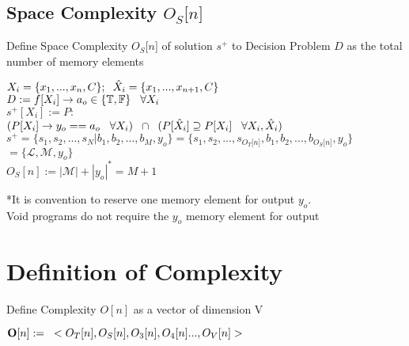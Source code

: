 \documentclass[11pt]{article}
\begin{document}
\subsection{Space Complexity $O_S \lbrack n \rbrack$}
Define Space Complexity $O_S \lbrack n \rbrack$ of solution $s^+$ to Decision Problem $D$ as the total number of memory elements
\begin{center}
\vspace{1mm}
$
X_i = \{x_1,...,x_n,C\}; \hspace{2mm} \hat{X}_i = \{x_1,...,x_{n+1},C\}
$
\\ \vspace{4mm}
$
D := f \lbrack X_i \rbrack \rightarrow a_{o} \in \{\mathbb{T}, \mathbb{F}\} \hspace{3mm} \forall X_i
$
\\ \vspace{4mm}
$
s^+[X_i] := P :
$
\\ \vspace{2mm}
$
(P \lbrack X_i \rbrack \rightarrow y_{o} == a_{o} \hspace{3mm} \forall X_i) \hspace{2mm} \cap \hspace{2mm} (P[\hat{X}_i] \supseteq P[X_i] \hspace{3mm} \forall X_i,\hat{X}_i)
$
\\ \vspace{4mm}
$
s^+ = \{ s_1,s_2,...,s_N|b_1,b_2,...,b_M,y_o\} = \{ s_1,s_2,...,s_{O_T \lbrack n \rbrack }, b_1, b_2,...,b_{O_S \lbrack n \rbrack},y_o \}
$
\\ \vspace{2mm}
$
= \{ \mathcal{L},\mathcal{M},y_o\}
$
\\ \vspace{3mm}
$
O_S[n] := |\mathcal{M}|+|y_o|^* = M + 1
$
\end{center}
\vspace{2mm}
*It is convention to reserve one memory element for output $y_o$.\\
Void programs do not require the $y_o$ memory element for output




\section{Definition of Complexity}
Define Complexity $O[n]$ as a vector of dimension V
\begin{center}
$
\bold{O}[n] := \hspace{3mm} < O_T [n], O_S [n],O_3[n],O_4[n]...,O_V[n]>
$
\end{center}
\end{document}
